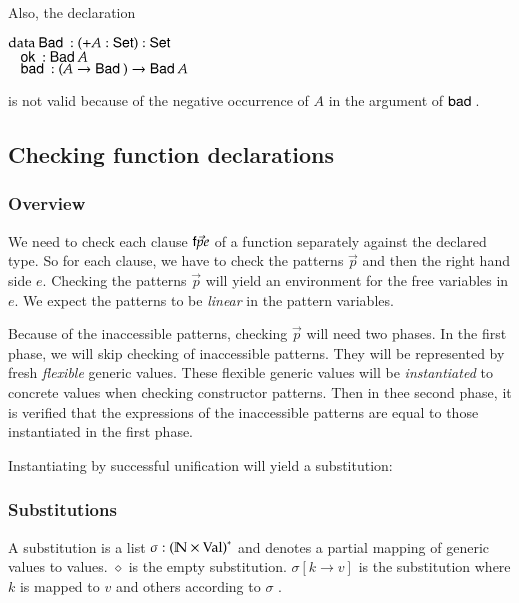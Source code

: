 Also, the declaration 
\begin{bsp}
$\mathrm{data}\: \mathsf{Bad}\: : ( + A : \mathsf{Set} ) : \mathsf{Set} $\\
$\hspace*{3mm} \mathsf{ok}\: : \mathsf{Bad}\: A$\\
$\hspace*{3mm} \mathsf{bad}\: : (A \rightarrow \mathsf{Bad}\:) \rightarrow \mathsf{Bad}\: A$
\end{bsp}
is not valid because of the negative occurrence of $A$ in the argument of $\mathsf{bad}\:$.
\subsection{Checking function declarations}

\newcommand\checkcl[2]{#1\:\mathbf{checkcl}\:#2}
\newcommand\checkp[5]{(#1)\vdash#2\:\mathbf{Pat}\:#3\Rightarrow (#4),#5}
\newcommand\checkps[5]{(#1)\vdash#2\:\mathbf{Pats}\:#3\Rightarrow (#4),#5}
\newcommand\checkinacc[4]{(#1)\vdash#2\:\mathbf{checkinacc}\:#3 : #4}
\newcommand\unify[5]{#1,#2\vdash#3\:\mathbf{inst}\:#4\Rightarrow #5}
\newcommand\unifylist[5]{#1,#2\vdash#3\:\mathbf{inst_{list}}\:#4\Rightarrow #5}


\subsubsection{Overview}
We need to check each clause $\mathsf{f} \vec{p} e$ of a function separately against the declared type.
So for each clause, we have to check the patterns $\vec{p}$ and then the right hand side $e$.
Checking the patterns $\vec{p}$ will yield an environment for the free variables in $e$.
We expect the patterns to be \emph{linear} in the pattern variables.

Because of the inaccessible patterns, checking $\vec{p}$ will need two phases.
In the first phase, we will skip checking of inaccessible patterns.
They will be represented by fresh \emph{flexible} generic values.
These flexible generic values will be \emph{instantiated} to concrete values when checking constructor patterns.
Then in thee second phase, it is verified that the expressions of the inaccessible patterns are equal to those instantiated in the first phase.
\newcommand{\subst}[2]{#1\{#2\}}
\newcommand{\substEnv}[2]{#1\{#2\}}
\newcommand{\compS}[2]{\mathrm{comp}\:#1\:#2}
\newcommand\ptv[2]{#1\Searrow#2}
\newcommand\ptvx{\mathrm{p2v}}
\newcommand\pstvs{\mathrm{p_{s}2v_{s}}}

Instantiating by successful unification will yield a substitution:
\subsubsection{Substitutions}
A substitution is a list $\sigma : {(\mathbb{N} \times \mathrm{Val})}^{\ast} $ and denotes a partial mapping of generic values to values.
$\diamond$ is the empty substitution.
$\sigma[k \rightarrow v] $ is the substitution where $k$ is mapped to $v$ and others according to $\sigma$ .

